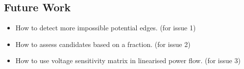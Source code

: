 \documentclass[
]{book}
\providecommand{\tightlist}{%
  \setlength{\itemsep}{0pt}\setlength{\parskip}{0pt}}
\begin{document}
\hypertarget{future-work}{%
\subsection*{Future Work}\label{future-work}}

\begin{itemize}
\tightlist
\item
  How to detect more impossible potential edges. (for issue 1)
\item
  How to assess candidates based on a fraction. (for issue 2)
\item
  How to use voltage sensitivity matrix in linearised power flow. (for issue 3)
\end{itemize}

  
\end{document}
